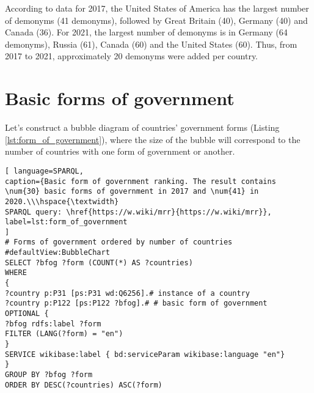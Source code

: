 
According to data for 2017, the United States of America has the largest number of demonyms (41 demonyms), followed by Great Britain (40), Germany (40) and Canada (36). For 2021, the largest number of demonyms is in Germany (64 demonyms), Russia (61), Canada (60) and the United States (60). Thus, from 2017 to 2021, approximately 20 demonyms were added per country.

\section{Basic forms of government}

Let's construct a bubble diagram of countries' government forms (Listing \ref{lst:form_of_government}), where the size of the bubble will correspond to the number of countries with one form of government or another.


\begin{lstlisting}[ language=SPARQL, 
caption={Basic form of government ranking. The result contains \num{30} basic forms of government in 2017 and \num{41} in 2020.\\\hspace{\textwidth}
SPARQL query: \href{https://w.wiki/mrr}{https://w.wiki/mrr}},
label=lst:form_of_government
]
# Forms of government ordered by number of countries
#defaultView:BubbleChart
SELECT ?bfog ?form (COUNT(*) AS ?countries)
WHERE 
{
?country p:P31 [ps:P31 wd:Q6256].# instance of a country
?country p:P122 [ps:P122 ?bfog].# # basic form of government
OPTIONAL {
?bfog rdfs:label ?form
FILTER (LANG(?form) = "en")
}
SERVICE wikibase:label { bd:serviceParam wikibase:language "en"}
}
GROUP BY ?bfog ?form
ORDER BY DESC(?countries) ASC(?form)
\end{lstlisting}

